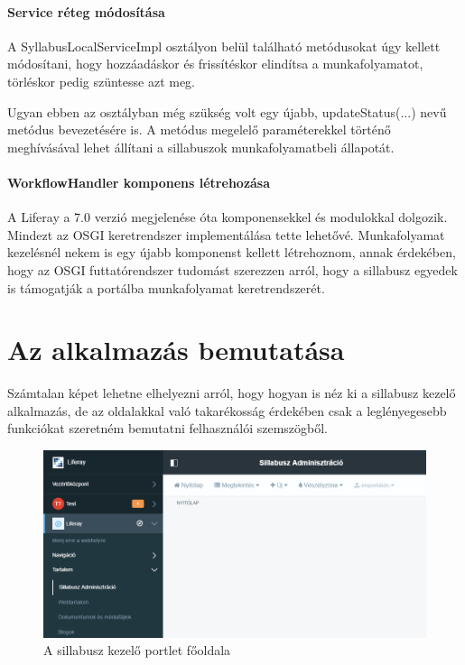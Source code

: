 \documentclass[hidelinks, 12pt, a4paper]{report}
\begin{document}
\subsubsection{Service réteg módosítása}

A SyllabusLocalServiceImpl osztályon belül található metódusokat úgy kellett módosítani, hogy hozzáadáskor és frissítéskor elindítsa a munkafolyamatot, törléskor pedig szüntesse azt meg.

Ugyan ebben az osztályban még szükség volt egy újabb, updateStatus(...) nevű metódus bevezetésére is. A metódus megelelő paraméterekkel történő meghívásával lehet állítani a sillabuszok munkafolyamatbeli állapotát.

\subsubsection{WorkflowHandler komponens létrehozása}

A Liferay a 7.0 verzió megjelenése óta komponensekkel és modulokkal dolgozik. Mindezt az OSGI keretrendszer implementálása tette lehetővé. Munkafolyamat kezelésnél nekem is egy újabb komponenst kellett létrehoznom, annak érdekében, hogy az OSGI futtatórendszer tudomást szerezzen arról, hogy a sillabusz egyedek is támogatják a portálba munkafolyamat keretrendszerét.

\chapter{Az alkalmazás bemutatása}

Számtalan képet lehetne elhelyezni arról, hogy hogyan is néz ki a sillabusz kezelő alkalmazás, de az oldalakkal való takarékosság érdekében csak a leglényegesebb funkciókat szeretném bemutatni felhasználói szemszögből.

\begin{figure}[H]
    \centering
	\includegraphics[width=\textwidth]{sm_main_page.png}
	\caption{A sillabusz kezelő portlet főoldala}
\end{figure}
\end{document}
